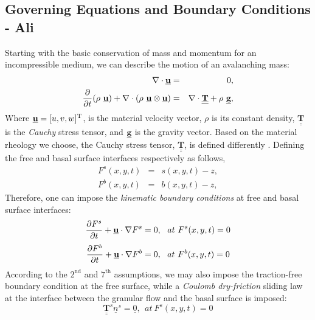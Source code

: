 \documentclass{article}
\def\dt{\partial t}
\begin{document}
\subsection{Governing Equations and Boundary Conditions - Ali}\label{subsec:GovEqsBCs}
Starting with the basic conservation of mass and momentum for an incompressible medium, we can describe the motion of an avalanching mass:
\begin{eqnarray}\label{eq:N_S}
\nabla \cdot\underline{{\textbf u}} &=& 0, \nonumber \\
\dfrac{\partial}{\dt}(\rho \ \underline{{\textbf u}})+\nabla \cdot (\rho \ \underline{{\textbf u}}\otimes \underline{{\textbf u}}) &=& \nabla \cdot \underline{\underline{{\mathbf{T}}}}+\rho \ \underline{{\textbf g}},
\end{eqnarray}
Where $\underline{{\textbf u}}=[u, v, w]^{\mathrm{T}}$, is the material velocity vector, $\rho$ is its constant density, $\underline{\underline{{\mathbf{T}}}}$ is the \textit{Cauchy} stress tensor, and $\underline{{\textbf g}}$ is the gravity vector. Based on the material rheology we choose, the Cauchy stress tensor, $\underline{\underline{{\mathbf{T}}}}$, is defined differently \citep{FreundtBursik1998}. Defining the free and basal surface interfaces respectively as follows,
\begin{eqnarray}\label{eq:surfacesDefs}
F^s(x,y,t) &=& s(x,y,t)-z, \nonumber \\
F^b(x,y,t) &=& b(x,y,t)-z,
\end{eqnarray}
Therefore, one can impose the \textit{kinematic boundary conditions} at free and basal surface interfaces:
\begin{equation}\label{eq:SurKinBC}
\frac{\partial F^s}{\dt} + \underline{{\textbf u}}\cdot\nabla F^s = 0, \ \ at \ F^s(x,y,t)=0
\end{equation}
\begin{equation}\label{eq:BedKinBC}
\frac{\partial F^b}{\dt} + \underline{{\textbf u}}\cdot\nabla F^b = 0, \ \ at \ F^b(x,y,t)=0
\end{equation}
According to the $\mathrm{2^{nd}}$ and $\mathrm{7^{th}}$ assumptions, we may also impose the traction-free boundary condition at the free surface, while a \textit{Coulomb dry-friction} sliding law at the interface between the granular flow and the basal surface is imposed:
\begin{equation}\label{eq:SurTracBC}
\underline{\underline{{\mathbf{T}}}}^s\underline{n}^s=\underline{0}, \ \ at \ F^s(x,y,t)=0
\end{equation}
\end{document}
